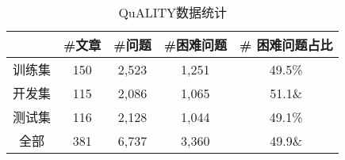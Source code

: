\begin{table}[htbp]
    \centering
    \caption{QuALITY数据统计}
    \label{tab:2-5}
    \begin{tabular}{ccccc}
        \hline
        & \#文章 & \#问题 & \#困难问题 & \# 困难问题占比 \\
        \hline
        训练集 & 150 & 2,523 & 1,251 & 49.5\% \\
        开发集 & 115 & 2,086 & 1,065 & 51.1\& \\
        测试集 & 116 & 2,128 & 1,044 & 49.1\% \\
        全部 & 381 & 6,737 & 3,360 & 49.9\& \\
        \hline
    \end{tabular}
\end{table}

